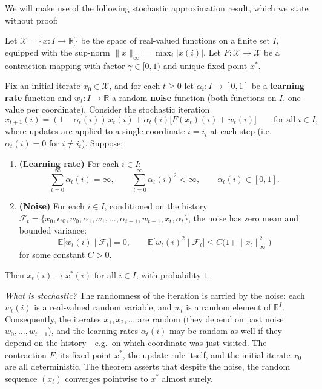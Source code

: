\documentclass[11pt]{article}
\begin{document}
We will make use of the following stochastic approximation result, which we state without proof:

\begin{theorem}\label{thm:stochastic_approx}
Let $\mathcal{X} = \{x : I \to \mathbb{R}\}$ be the space of real-valued functions on a finite set $I$, equipped with the sup-norm $\|x\|_\infty = \max_i |x(i)|$. Let $F : \mathcal{X} \to \mathcal{X}$ be a contraction mapping with factor $\gamma \in [0,1)$ and unique fixed point $x^*$.

Fix an initial iterate $x_0 \in \mathcal{X}$, and for each $t \geq 0$ let $\alpha_t : I \to [0,1]$ be a \textbf{learning rate} function and $w_t : I \to \mathbb{R}$ a random \textbf{noise} function (both functions on $I$, one value per coordinate). Consider the stochastic iteration
$$
x_{t+1}(i) = (1 - \alpha_t(i))\, x_t(i) + \alpha_t(i)\bigl[F(x_t)(i) + w_t(i)\bigr] \qquad \text{for all } i \in I,
$$
where updates are applied to a single coordinate $i = i_t$ at each step (i.e.\ $\alpha_t(i) = 0$ for $i \neq i_t$). Suppose:
\begin{enumerate}
\item[(a)] \textbf{(Learning rate)} For each $i \in I$:
$$
\sum_{t=0}^{\infty} \alpha_t(i) = \infty, \qquad \sum_{t=0}^{\infty} \alpha_t(i)^2 < \infty, \qquad \alpha_t(i) \in [0,1].
$$
\item[(b)] \textbf{(Noise)} For each $i \in I$, conditioned on the history $\mathcal{F}_t = \{x_0, \alpha_0, w_0, \alpha_1, w_1, \ldots, \alpha_{t-1}, w_{t-1}, x_t, \alpha_t\}$, the noise has zero mean and bounded variance:
$$
\mathbb{E}\big[w_t(i) \mid \mathcal{F}_t\big] = 0, \qquad \mathbb{E}\big[w_t(i)^2 \mid \mathcal{F}_t\big] \le C\bigl(1 + \|x_t\|_\infty^2\bigr)
$$
for some constant $C > 0$.
\end{enumerate}
Then $x_t(i) \to x^*(i)$ for all $i \in I$, with probability $1$.
\end{theorem}

\emph{What is stochastic?}
The randomness of the iteration is carried by the noise: each $w_t(i)$ is a real-valued random variable, and $w_t$ is a random element of $\mathbb{R}^I$. Consequently, the iterates $x_1, x_2, \ldots$ are random (they depend on past noise $w_0, \ldots, w_{t-1}$), and the learning rates $\alpha_t(i)$ may be random as well if they depend on the history---e.g.\ on which coordinate was just visited. The contraction $F$, its fixed point $x^*$, the update rule itself, and the initial iterate $x_0$ are all deterministic. The theorem asserts that despite the noise, the random sequence $(x_t)$ converges pointwise to $x^*$ almost surely.
\end{document}
